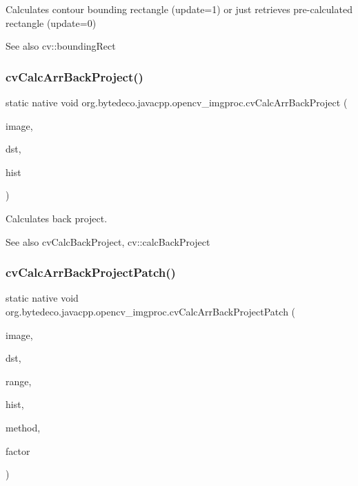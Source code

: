 Calculates contour bounding rectangle (update=1) or just retrieves pre-\/calculated rectangle (update=0) 

\begin{DoxySeeAlso}{See also}
cv\+::bounding\+Rect 
\end{DoxySeeAlso}
\mbox{\label{group__imgproc__c_ga579d781d25a70bccc1432e6c6d1fc95c}} 
\subsubsection{\texorpdfstring{cv\+Calc\+Arr\+Back\+Project()}{cvCalcArrBackProject()}}
{\footnotesize\ttfamily static native void org.\+bytedeco.\+javacpp.\+opencv\+\_\+imgproc.\+cv\+Calc\+Arr\+Back\+Project (\begin{DoxyParamCaption}\item[{@Cast(\char`\"{}Cv\+Arr$\ast$$\ast$\char`\"{}) Pointer\+Pointer}]{image,  }\item[{Cv\+Arr}]{dst,  }\item[{@Const Cv\+Histogram}]{hist }\end{DoxyParamCaption})\hspace{0.3cm}{\ttfamily [static]}}



Calculates back project. 

\begin{DoxySeeAlso}{See also}
cv\+Calc\+Back\+Project, cv\+::calc\+Back\+Project 
\end{DoxySeeAlso}
\mbox{\label{group__imgproc__c_ga31746133be041f7be11b46e7df88363e}} 
\subsubsection{\texorpdfstring{cv\+Calc\+Arr\+Back\+Project\+Patch()}{cvCalcArrBackProjectPatch()}}
{\footnotesize\ttfamily static native void org.\+bytedeco.\+javacpp.\+opencv\+\_\+imgproc.\+cv\+Calc\+Arr\+Back\+Project\+Patch (\begin{DoxyParamCaption}\item[{@Cast(\char`\"{}Cv\+Arr$\ast$$\ast$\char`\"{}) Pointer\+Pointer}]{image,  }\item[{Cv\+Arr}]{dst,  }\item[{@By\+Val Cv\+Size}]{range,  }\item[{Cv\+Histogram}]{hist,  }\item[{int}]{method,  }\item[{double}]{factor }\end{DoxyParamCaption})\hspace{0.3cm}{\ttfamily [static]}}



